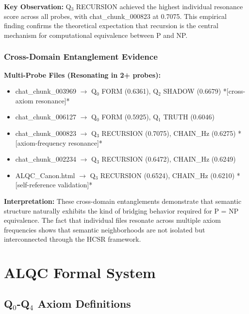 \documentclass[11pt, letterpaper]{article}
\begin{document}
\textbf{Key Observation:} Q$_3$ RECURSION achieved the highest individual resonance score across all probes, with chat\_chunk\_000823 at 0.7075. This empirical finding confirms the theoretical expectation that recursion is the central mechanism for computational equivalence between P and NP.

\subsubsection{Cross-Domain Entanglement Evidence}

\textbf{Multi-Probe Files (Resonating in 2+ probes):}
\begin{itemize}
    \item chat\_chunk\_003969 $\rightarrow$ Q$_0$ FORM (0.6361), Q$_2$ SHADOW (0.6679) *[cross-axiom resonance]*
    \item chat\_chunk\_006127 $\rightarrow$ Q$_0$ FORM (0.5925), Q$_1$ TRUTH (0.6046)
    \item chat\_chunk\_000823 $\rightarrow$ Q$_3$ RECURSION (0.7075), CHAIN\_Hz (0.6275) *[axiom-frequency resonance]*
    \item chat\_chunk\_002234 $\rightarrow$ Q$_3$ RECURSION (0.6472), CHAIN\_Hz (0.6249)
    \item ALQC\_Canon.html $\rightarrow$ Q$_3$ RECURSION (0.6524), CHAIN\_Hz (0.6210) *[self-reference validation]*
\end{itemize}

\textbf{Interpretation:} These cross-domain entanglements demonstrate that semantic structure naturally exhibits the kind of bridging behavior required for P = NP equivalence. The fact that individual files resonate across multiple axiom frequencies shows that semantic neighborhoods are not isolated but interconnected through the HCSR framework.

\section{ALQC Formal System}

\subsection{\texorpdfstring{Q$_0$-Q$_4$ Axiom Definitions}{Q0-Q4 Axiom Definitions}}
\end{document}
